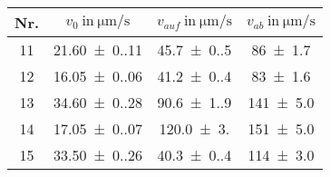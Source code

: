 \begin{tabular}{c c c c}
    \toprule
    {Nr.} & {$v_0~\text{in}~\unit{\micro\meter\per\second}$} & {$v_{auf}~\text{in}~\unit{\micro\meter\per\second}$} & {$v_{ab}~\text{in}~\unit{\micro\meter\per\second}$} \\
    \midrule
    11    & \num{21.60(0.11)}                                & \num{45.7(0.5)}                                      & \num{86(1.7)}                                       \\
    12    & \num{16.05(0.06)}                                & \num{41.2(0.4)}                                      & \num{83(1.6)}                                       \\
    13    & \num{34.60(0.28)}                                & \num{90.6(1.9)}                                      & \num{141(5.0)}                                      \\
    14    & \num{17.05(0.07)}                                & \num{120.0(3.0)}                                     & \num{151(5.0)}                                      \\
    15    & \num{33.50(0.26)}                                & \num{40.3(0.4)}                                      & \num{114(3.0)}                                      \\
    \bottomrule
\end{tabular}
